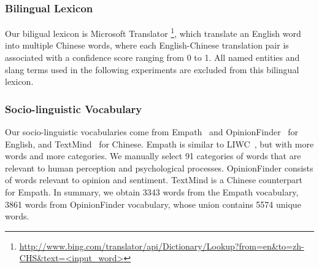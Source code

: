 \subsubsection{Bilingual Lexicon}
\label{sec:blpre}
Our biligual lexicon is Microsoft Translator 
\footnote{{\url{http://www.bing.com/translator/api/Dictionary/Lookup?from=en&to=zh-CHS&text=<input_word>}}}, which translate an English word into multiple
Chinese words, where each English-Chinese translation pair is associated with
a confidence score ranging from 0 to 1. All named entities and slang terms used
in the following experiments are excluded from this bilingual lexicon.



\subsubsection{Socio-linguistic Vocabulary}
\label{sec:sv}
Our socio-linguistic vocabularies come from 
Empath~\cite{fast2016empath} and OpinionFinder~\cite{choi2005identifying} 
for English, and TextMind~\cite{gao2013developing} for Chinese.
Empath is similar to LIWC~\cite{pennebaker2001linguistic},
but with more words and more categories. 
We manually select 91 categories of words that are 
relevant to human perception and psychological processes. 
OpinionFinder consists of words relevant to opinion and sentiment. 
TextMind is a Chinese counterpart for Empath.
%
In summary, we obtain 3343 words from the Empath vocabulary,  
3861 words from OpinionFinder vocabulary, 
whose union contains 5574 unique words. 




